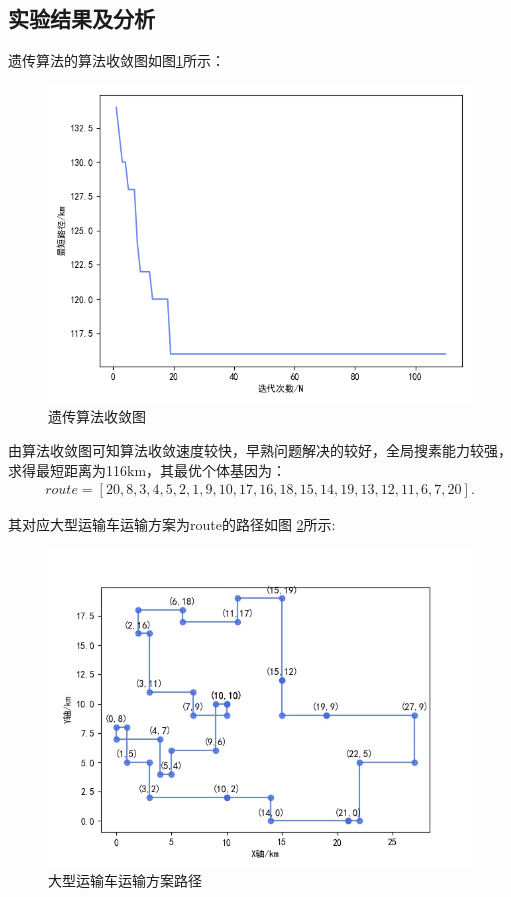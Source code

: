 \documentclass{whutmod}
\begin{document}
      \subsection{实验结果及分析}
      遗传算法的算法收敛图如图\ref{llsffssl}所示：
               \begin{figure}[H]
      	\centering
      	\includegraphics[width=\textwidth]{figures/y1.png}
      	\caption{遗传算法收敛图
      	}\label{llsffssl}
      \end{figure}
      
      
      
      由算法收敛图可知算法收敛速度较快，早熟问题解决的较好，全局搜素能力较强， 求得最短距离为116km，其最优个体基因为：
               \begin{gather*}
      route = [20,8,3,4,5,2,1,9,10,17,16,18,15,14,19,13,12,11,6,7,20].
      \end{gather*}

      
      其对应大型运输车运输方案为route的路径如图 \ref{llsssl}所示:
  
         \begin{figure}[H]
         	\centering
         	\includegraphics[width=\textwidth]{figures/11.jpg}
         	\caption{大型运输车运输方案路径}\label{llsssl}
         \end{figure}
     
\end{document}
